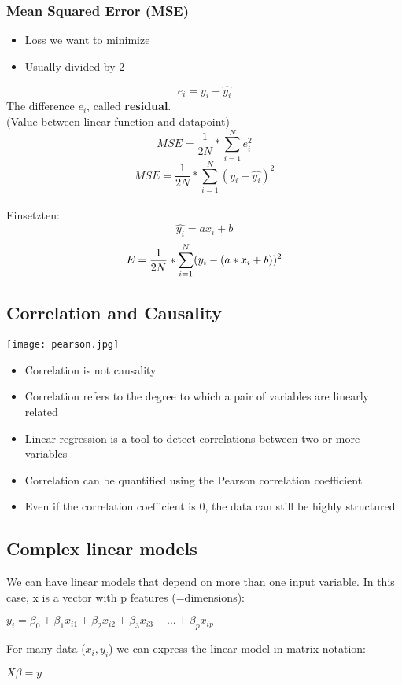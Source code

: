 \subsubsection{Mean Squared Error (MSE)}
\begin{itemize}
    \item Loss we want to minimize
    \item Usually divided by 2
\end{itemize}
    $$e_i = y_i - \hat{y_i}$$
    The difference $e_i$, called \textbf{residual}.\\
    (Value between linear function and datapoint)
    $$MSE = \frac{1}{2N} * \displaystyle\sum_{i = 1}^{N} e_i^2$$
    $$MSE = \frac{1}{2N} * \displaystyle\sum_{i = 1}^{N} (y_i - \hat{y_i})^2$$\\
    Einsetzten:
    $$\hat{y_i} = ax_i + b$$
    $$E = \frac{1}{2N} * \large\displaystyle\sum_{i = 1}^{N}({y_i} - (a*x_i + b))^2$$

\subsection{Correlation and Causality}
\texttt{[image: pearson.jpg]}
\begin{itemize}
    \item Correlation is not causality
    \item Correlation refers to the degree to which a pair of variables are linearly related
    \item Linear regression is a tool to detect correlations between two or more variables
    \item Correlation can be quantified using the Pearson correlation coefficient
    \item Even if the correlation coefficient is 0, the data can still be highly structured
\end{itemize}

\subsection{Complex linear models}
We can have linear models that depend on more than one input variable.
In this case, x is a vector with p features (=dimensions):
\begin{center}
    $y_i = \beta_0 + \beta_1 x_{i1} + \beta_2 x_{i2} + \beta_3 x_{i3} + \dots + \beta_p x_{ip}$
\end{center}
For many data ($x_i,y_i$) we can express the linear model in matrix notation:
\begin{center}
    $X\beta = y$
\end{center}
